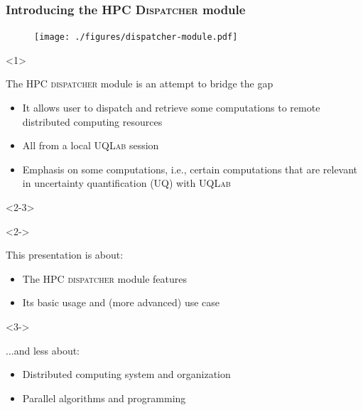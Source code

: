 \documentclass[]{rsuqbeamernew}
\begin{document}
\begin{frame}
\frametitle{Introducing the HPC \textsc{Dispatcher} module}

\begin{figure}[htbp]
  \texttt{[image: ./figures/dispatcher-module.pdf]}
\end{figure}    

\begin{onlyenv}<1>
\begin{block}{The HPC \textsc{dispatcher} module is an attempt to bridge the gap}
  \begin{itemize}
    \item It allows user to dispatch and retrieve {\altx some computations}
          to remote distributed computing resources
    \item All from a local \textsc{UQLab} session
    \item Emphasis on {\altx some computations}, i.e.,
          certain computations that are relevant in uncertainty quantification (UQ)
          with \textsc{UQLab}
  \end{itemize}
\end{block}
\end{onlyenv}

\begin{onlyenv}<2-3>
  \begin{onslide}<2->
  \begin{block}{This presentation is about:}
    \begin{itemize}
      \item The HPC \textsc{dispatcher} module features
      \item Its basic usage and (more advanced) use case
    \end{itemize}
  \end{block}
\end{onslide}

\begin{onslide}<3->
  \begin{block}{...and less about:}
    \begin{itemize}
      \item Distributed computing system and organization
      \item Parallel algorithms and programming
    \end{itemize}
  \end{block}
\end{onslide}
\end{onlyenv}

\end{frame}
\end{document}
